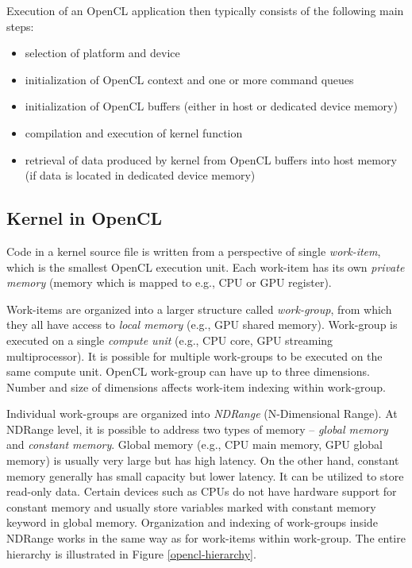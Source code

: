 \documentclass
[
    digital, %
    oneside, %
    table, %
    nolof, %
    nolot, %
    nocover %
]{fithesis3}
\begin{document}
Execution of an OpenCL application then typically consists of the following main steps:
\begin{itemize}
    \item selection of platform and device 
    \item initialization of OpenCL context and one or more command queues
    \item initialization of OpenCL buffers (either in host or dedicated device memory)
    \item compilation and execution of kernel function
    \item retrieval of data produced by kernel from OpenCL buffers into host memory (if data is located in dedicated device memory)
\end{itemize}

\subsection{Kernel in OpenCL}
\label{kernel}
Code in a kernel source file is written from a perspective of single \textit{work-item}, which is the smallest OpenCL execution unit. Each work-item
has its own \textit{private memory} (memory which is mapped to e.g., CPU or GPU register).

Work-items are organized into a larger structure called \textit{work-group}, from which they all have access to \textit{local memory} (e.g., GPU shared
memory). Work-group is executed on a single \textit{compute unit} (e.g., CPU core, GPU streaming multiprocessor). It is possible for multiple work-groups
to be executed on the same compute unit. OpenCL work-group can have up to three dimensions. Number and size of dimensions affects work-item indexing
within work-group.

Individual work-groups are organized into \textit{NDRange} (N-Dimensional Range). At NDRange level, it is possible to address two types of memory --
\textit{global memory} and \textit{constant memory}. Global memory (e.g., CPU main memory, GPU global memory) is usually very large but has high
latency. On the other hand, constant memory generally has small capacity but lower latency. It can be utilized to store read-only data. Certain devices
such as CPUs do not have hardware support for constant memory and usually store variables marked with constant memory keyword in global memory.
Organization and indexing of work-groups inside NDRange works in the same way as for work-items within work-group. The entire hierarchy is illustrated
in Figure \ref{opencl-hierarchy}.
\end{document}
